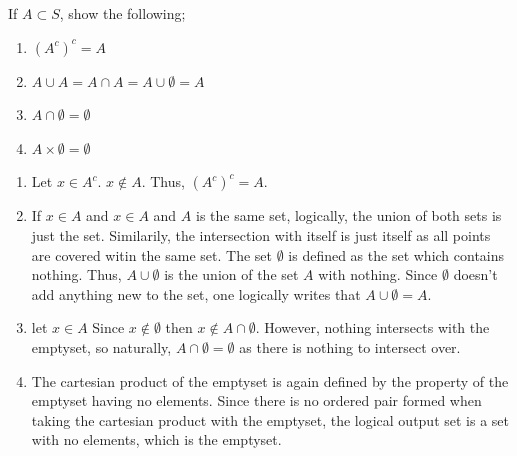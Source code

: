 \begin{problem}
    If $A \subset S$, show the following;
    \begin{enumerate}[label=\alph*.]
        \item  $(A^c)^c = A$
        \item $A\cup A = A\cap A = A \cup \emptyset = A$
        \item $A \cap \emptyset = \emptyset$
        \item $A \times \emptyset = \emptyset$
    \end{enumerate}
\end{problem}

\begin{solution}
    \begin{enumerate}[label=\arabic{*}.]
        \item Let $x\in A^c$. $x\notin A$. Thus, $(A^c)^c = A$.
        \item If $x\in A$ and $x \in A$ and $A$ is the same set, logically, the union of both sets is just the set. Similarily, the intersection with itself is just itself as all points are covered witin the same set. The set $\emptyset$ is defined as the set which contains nothing. Thus, $A \cup \emptyset$ is the union of the set $A$ with nothing. Since $\emptyset$ doesn't add anything new to the set, one logically writes that $A\cup \emptyset = A$.
        \item let $x\in A$ Since $x \notin \emptyset$ then $x \notin A \cap \emptyset$. However, nothing intersects with the emptyset, so naturally, $A\cap \emptyset = \emptyset$ as there is nothing to intersect over. 
        \item The cartesian product of the emptyset is again defined by the property of the emptyset having no elements. Since there is no ordered pair formed when taking the cartesian product with the emptyset, the logical output set is a set with no elements, which is the emptyset. 
    \end{enumerate}
\end{solution}

